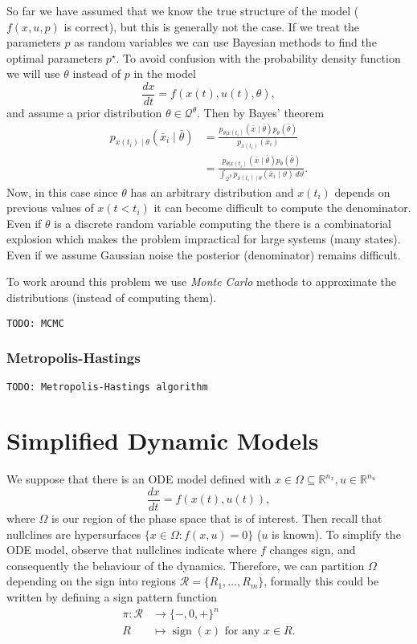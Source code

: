 \documentclass[a4paper]{article}
\newcommand{\todo}[1]{\texttt{TODO: #1}}
\newcommand{\given}{\mid}
\DeclareMathOperator{\sign}{sign}
\theoremstyle{plain}
\theoremstyle{definition}
\theoremstyle{remark}
\begin{document}
So far we have assumed that we know the true structure of the model ($f(x, u,
p)$ is correct), but this is generally not the case. If we treat the
parameters $p$ as random variables we can use Bayesian methods to find the
optimal parameters $p^\star$. To avoid confusion with the probability density
function we will use $\theta$ instead of $p$ in the model
\[
  \frac{dx}{dt} = f(x(t), u(t), \theta),
\]
and assume a prior distribution $\theta \in \mathcal{Q}^\theta$. Then by
Bayes' theorem
\begin{align*}
  p_{x(t_i) \given \theta} (\bar{x}_i \given \bar{\theta})
  &= \frac{
      p_{\theta | x(t_i)} (\bar{x} \given \bar{\theta}) 
      p_\theta(\bar{\theta})
    }{
      p_{x(t_i)} (\bar{x}_i)
   } \\
  &= \frac{
      p_{\theta | x(t_i)} (\bar{x} \given \bar{\theta}) 
      p_\theta(\bar{\theta})
    }{
      \int_{\mathcal{Q}^\theta} p_{x(t_i) \given {\theta}} 
      (\bar{x}_i \given \vartheta) \, d\vartheta
    }.
\end{align*}
Now, in this case since $\theta$ has an arbitrary distribution and $x(t_i)$
depends on previous values of $x(t < t_i)$ it can become difficult to compute
the denominator. Even if $\theta$ is a discrete random variable computing the
there is a combinatorial explosion which makes the problem impractical for
large systems (many states). Even if we assume Gaussian noise the posterior
(denominator) remains difficult.

To work around this problem we use \emph{Monte Carlo} methods to approximate
the distributions (instead of computing them).

\todo{MCMC}

\subsubsection{Metropolis-Hastings}

\todo{Metropolis-Hastings algorithm}



\section{Simplified Dynamic Models}

We suppose that there is an ODE model defined with $x \in \Omega \subseteq
\mathbb{R}^{n_x}, u \in \mathbb{R}^{n_u}$
\[
  \frac{dx}{dt} = f(x(t), u(t)),
\]
where $\Omega$ is our region of the phase space that is of interest. Then
recall that nullclines are hypersurfaces $\{x \in \Omega : f(x, u) = 0\}$ ($u$
is known). To simplify the ODE model, observe that nullclines indicate where
$f$ changes sign, and consequently the behaviour of the dynamics. Therefore,
we can partition $\Omega$ depending on the sign into regions $\mathcal{R} =
\{R_1, \ldots, R_m\}$, formally this could be written by defining a sign
pattern function
\begin{align*}
  \pi: \mathcal{R} &\to \{-,0,+\}^n \\
    R &\mapsto \sign(x) \text{ for any } x \in R.
\end{align*}
\end{document}
